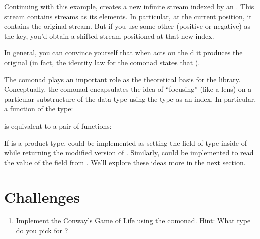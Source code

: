 Continuing with this example,  creates a new infinite
stream indexed by an . This stream contains streams as its
elements. In particular, at the current position, it contains the
original stream. But if you use some other  (positive or
negative) as the key, you'd obtain a shifted stream positioned at that
new index.

In general, you can convince yourself that when  acts on
the d  it produces the original
 (in fact, the identity law for the comonad states that
).

The  comonad plays an important role as the theoretical
basis for the  library. Conceptually, the
 comonad encapsulates the idea of ``focusing'' (like
a lens) on a particular substructure of the data type  using
the type  as an index. In particular, a function of the type:

is equivalent to a pair of functions:

If  is a product type,  could be implemented as
setting the field of type  inside of  while
returning the modified version of . Similarly, 
could be implemented to read the value of the  field from
. We'll explore these ideas more in the next section.

\section{Challenges}

\begin{enumerate}
  \tightlist
  \item
        Implement the Conway's Game of Life using the  comonad.
        Hint: What type do you pick for ?
\end{enumerate}

